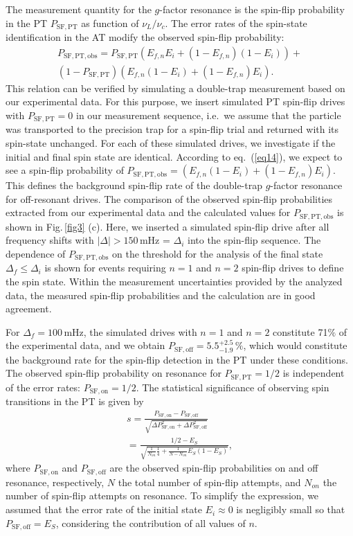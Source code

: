 \documentclass[preprint%
]{elsarticle}
\begin{document}
The measurement quantity for the $g$-factor resonance is the spin-flip probability in the PT $P_{\mathrm{SF,PT}}$ as function of $\nu_L/\nu_c$. The error rates of the spin-state identification in the AT modify the observed spin-flip probability:
\begin{eqnarray}
P_{\mathrm{SF,PT,obs}} = P_{\mathrm{SF,PT}} (E_{f,n} E_i + (1-E_{f,n})(1-E_i)) +\nonumber\\ (1 - P_{\mathrm{SF,PT}}) (E_{f,n} (1-E_i) + (1-E_{f,n})E_i).
\label{eq14}
\end{eqnarray}
This relation can be verified by simulating a double-trap measurement based on our experimental data. For this purpose, we insert simulated PT spin-flip drives with $P_{\mathrm{SF,PT}}=0$ in our measurement sequence, i.e.~we assume that the particle was transported to the precision trap for a spin-flip trial and returned with its spin-state unchanged. For each of these simulated drives, we investigate if the initial and final spin state are identical. According to eq.~(\ref{eq14}), we expect to see a spin-flip probability of $P_{\mathrm{SF,PT,obs}}=(E_{f,n} (1-E_i) + (1-E_{f,n})E_i)$. This defines the background spin-flip rate of the double-trap $g$-factor resonance for off-resonant drives. The comparison of the observed spin-flip probabilities extracted from our experimental data and the calculated values for $P_{\mathrm{SF,PT,obs}}$ is shown in Fig.$\,$\ref{fig3} (c). Here, we inserted a simulated spin-flip drive after all frequency shifts with $|\Delta| > 150\,$mHz = $\Delta_i$ into the spin-flip sequence. The dependence of $P_{\mathrm{SF,PT,obs}}$ on the threshold for the analysis of the final state $\Delta_f \leq \Delta_i$ is shown for events requiring $n=1$ and $n=2$ spin-flip drives to define the spin state. Within the measurement uncertainties provided by the analyzed data, the measured spin-flip probabilities and the calculation are in good agreement. 

For $\Delta_f = 100\,$mHz, the simulated drives with $n=1$ and $n=2$ constitute 71$\%$ of the experimental data, and we obtain $P_{\mathrm{SF,off}}= 5.5^{+2.5}_{-1.9}\,\%$, which would constitute the background rate for the spin-flip detection in the PT under these conditions. The observed spin-flip probability on resonance for $P_{\mathrm{SF,PT}}=1/2$ is independent of the error rates: $P_{\mathrm{SF,on}} = 1/2$. The statistical significance of observing spin transitions in the PT is given by
\begin{eqnarray}
s = \frac{P_{\mathrm{SF,on}}-P_{\mathrm{SF,off}}}{\sqrt{\Delta P_{\mathrm{SF,on}}^2+\Delta P_{\mathrm{SF,off}}^2}} \nonumber\\
= \frac{1/2 - E_{S}}{\sqrt{\frac{1}{N_{on}}\frac{1}{4}+\frac{1}{N - N_{on}}E_{S} (1-E_{S})}},
\end{eqnarray}
where $P_{\mathrm{SF,on}}$ and $P_{\mathrm{SF,off}}$ are the observed spin-flip probabilities on and off resonance, respectively, $N$ the total number of spin-flip attempts, and $N_{on}$ the number of spin-flip attempts on resonance. To simplify the expression, we assumed that the error rate of the initial state $E_i \approx 0$ is negligibly small so that $P_{\mathrm{SF,off}} = E_S$, considering the contribution of all values of $n$. 
\end{document}
